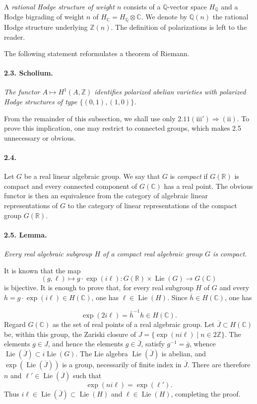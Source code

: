 \documentclass[10pt,leqno]{article}
\newcommand{\C}{\mathbb{C}}
\newcommand{\Q}{\mathbb{Q}}
\newcommand{\R}{\mathbb{R}}
\newcommand{\Z}{\mathbb{Z}}
\newcommand{\Lie}{\operatorname{Lie}}
\begin{document}
A \emph{rational Hodge structure of weight $n$} consists of a $\Q$-vector space $H_\Q$ and a Hodge bigrading of weight $n$ of $H_\C=H_\Q\otimes\C$. We denote by $\Q(n)$ the rational Hodge structure underlying $\Z(n)$. The definition of polarizations is left to the reader.

The following statement reformulates a theorem of Riemann.

\paragraph{2.3. Scholium.} \emph{The functor $A\mapsto H^1(A,\Z)$ identifies polarized abelian varieties with polarized Hodge structures of type $\{(0,1),(1,0)\}$.}

From the remainder of this subsection, we shall use only $2.11(\mathrm{iii}')\Rightarrow(\mathrm{ii})$. To prove this implication, one may restrict to connected groups, which makes 2.5 unnecessary or obvious.

\paragraph{2.4.} Let $G$ be a real linear algebraic group. We say that $G$ is \emph{compact} if $G(\R)$ is compact and every connected component of $G(\C)$ has a real point. The obvious functor is then an equivalence from the category of algebraic linear representations of $G$ to the category of linear representations of the compact group $G(\R)$.

\paragraph{2.5. Lemma.} \emph{Every real algebraic subgroup $H$ of a compact real algebraic group $G$ is compact.}

It is known that the map
\[
(g,\ell)\longmapsto g\cdot\exp(i\ell):G(\R)\times\Lie(G)\longrightarrow G(\C)
\]
is bijective. It is enough to prove that, for every real subgroup $H$ of $G$ and every $h=g\cdot\exp(i\ell)\in H(\C)$, one has $\ell\in\Lie(H)$. Since $\bar h\in H(\C)$, one has

\clearpage

\[
\exp(2i\ell)=\bar h^{-1}h\in H(\C).
\]
Regard $G(\C)$ as the set of real points of a real algebraic group. Let $\overline J\subset H(\C)$ be, within this group, the Zariski closure of $J=\{\exp(ni\ell)\mid n\in2\Z\}$. The elements $g\in J$, and hence the elements $g\in\overline J$, satisfy $g^{-1}=\bar g$, whence $\Lie(\overline J)\subset i\Lie(G)$. The Lie algebra $\Lie(\overline J)$ is abelian, and $\exp(\Lie(\overline J))$ is a group, necessarily of finite index in $\overline J$. There are therefore $n$ and $\ell'\in\Lie(\overline J)$ such that
\[
\exp(ni\ell)=\exp(\ell').
\]
Thus $i\ell\in\Lie(\overline J)\subset\Lie(H)$ and $\ell\in\Lie(H)$, completing the proof.
\end{document}
